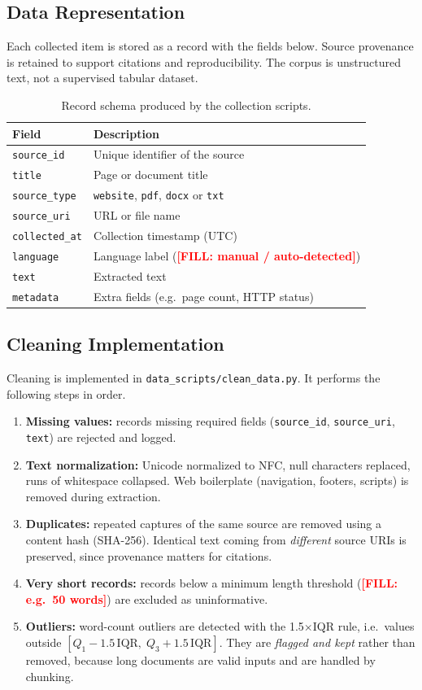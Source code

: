 \documentclass[11pt,a4paper]{article}
\newcommand{\todo}[1]{\textcolor{red}{\textbf{[FILL: #1]}}}
\begin{document}
\subsection{Data Representation}
Each collected item is stored as a record with the fields below. Source provenance is retained to support citations and reproducibility. The corpus is unstructured text, not a supervised tabular dataset.
\begin{table}[H]
\centering
\caption{Record schema produced by the collection scripts.}
\begin{tabular}{lp{9cm}}
\toprule
\textbf{Field} & \textbf{Description} \\
\midrule
\texttt{source\_id} & Unique identifier of the source \\
\texttt{title} & Page or document title \\
\texttt{source\_type} & \texttt{website}, \texttt{pdf}, \texttt{docx} or \texttt{txt} \\
\texttt{source\_uri} & URL or file name \\
\texttt{collected\_at} & Collection timestamp (UTC) \\
\texttt{language} & Language label (\todo{manual / auto-detected}) \\
\texttt{text} & Extracted text \\
\texttt{metadata} & Extra fields (e.g.\ page count, HTTP status) \\
\bottomrule
\end{tabular}
\end{table}

\subsection{Cleaning Implementation}
Cleaning is implemented in \texttt{data\_scripts/clean\_data.py}. It performs the following steps in order.
\begin{enumerate}[nosep]
  \item \textbf{Missing values:} records missing required fields (\texttt{source\_id}, \texttt{source\_uri}, \texttt{text}) are rejected and logged.
  \item \textbf{Text normalization:} Unicode normalized to NFC, null characters replaced, runs of whitespace collapsed. Web boilerplate (navigation, footers, scripts) is removed during extraction.
  \item \textbf{Duplicates:} repeated captures of the same source are removed using a content hash (SHA-256). Identical text coming from \emph{different} source URIs is preserved, since provenance matters for citations.
  \item \textbf{Very short records:} records below a minimum length threshold (\todo{e.g.\ 50 words}) are excluded as uninformative.
  \item \textbf{Outliers:} word-count outliers are detected with the 1.5$\times$IQR rule, i.e.\ values outside $[Q_1-1.5\,\mathrm{IQR},\;Q_3+1.5\,\mathrm{IQR}]$. They are \emph{flagged and kept} rather than removed, because long documents are valid inputs and are handled by chunking.
\end{enumerate}
\end{document}
